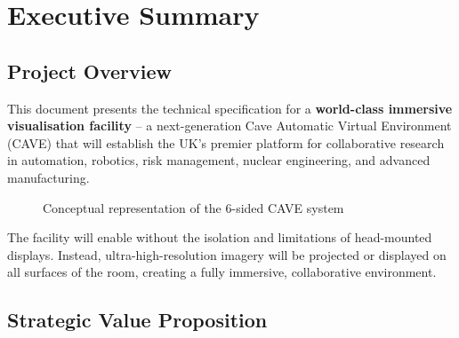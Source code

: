 \chapter*{Executive Summary}

\section*{Project Overview}

This document presents the technical specification for a \textbf{world-class immersive visualisation facility} – a next-generation Cave Automatic Virtual Environment (CAVE) that will establish the UK's premier platform for collaborative research in automation, robotics, risk management, nuclear engineering, and advanced manufacturing.

\begin{figure}[H]
\centering
{}
\caption{Conceptual representation of the 6-sided CAVE system}
\end{figure}

The facility will enable  without the isolation and limitations of head-mounted displays. Instead, ultra-high-resolution imagery will be projected or displayed on all surfaces of the room, creating a fully immersive, collaborative environment.

\section*{Strategic Value Proposition}

